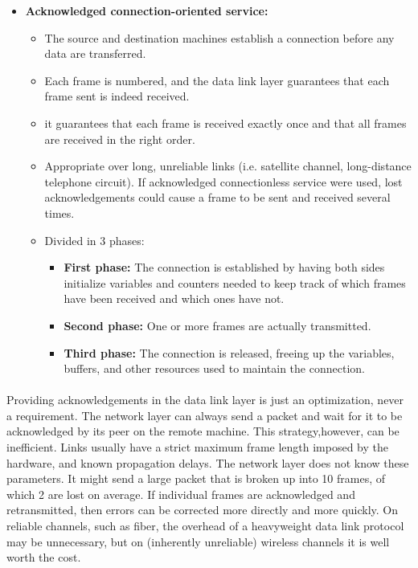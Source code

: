 \documentclass[../resumosRCOM.tex]{subfiles}
\begin{document}
\begin{itemize}
    \item \textbf{Acknowledged connection-oriented service: }
    \begin{itemize}
        \item The source and destination machines establish a connection 
        before any data are transferred.
        \item Each frame is numbered, and the data link layer guarantees 
        that each frame sent is indeed received.
        \item it guarantees that each frame is received exactly once and 
        that all frames are received in the right order.
        \item Appropriate over long, unreliable links (i.e. satellite channel,
         long-distance telephone circuit). If acknowledged connectionless 
         service were used, lost acknowledgements could cause a frame to be 
         sent and received several times.
        \item Divided in 3 phases:
        \begin{itemize}
            \item \textbf{First phase: }The connection is established by having
             both sides initialize variables and counters needed to keep track of
             which frames have been received and which ones have not.
             \item \textbf{Second phase: } One or more frames are actually transmitted.
             \item \textbf{Third phase: } The connection is released, freeing
            up the variables, buffers, and other resources used to maintain 
            the connection.
        \end{itemize}
    \end{itemize}
\end{itemize}

\paragraph{}
Providing acknowledgements in the data link layer is just an optimization, 
never a requirement. The network layer can always send a packet and wait 
for it to be acknowledged by its peer on the remote machine. 
This strategy,however, can be inefficient. Links usually have a strict maximum
frame length imposed by the hardware, and known propagation delays. 
The network layer does not know these parameters. 
It might send a large packet that is broken up into 10 frames, of which 
2 are lost on average. If individual frames are acknowledged and
retransmitted, then errors can be corrected more directly and more quickly.
On reliable channels, such as fiber, the overhead of a heavyweight data link 
protocol may be unnecessary, but on (inherently unreliable) wireless channels 
it is well worth the cost.
\end{document}
